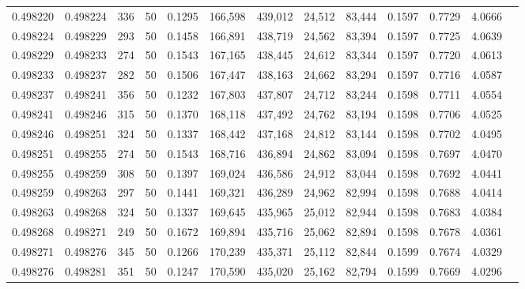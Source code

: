 \begin{tabular}{rrrrrrrrrrrrr}
0.498220 & 0.498224 & 336 &  50 &                                     0.1295 & 166,598 & 439,012 &  24,512 &  83,444 & 0.1597 & 0.7729 & 4.0666 \\
0.498224 & 0.498229 & 293 &  50 &                                     0.1458 & 166,891 & 438,719 &  24,562 &  83,394 & 0.1597 & 0.7725 & 4.0639 \\
0.498229 & 0.498233 & 274 &  50 &                                     0.1543 & 167,165 & 438,445 &  24,612 &  83,344 & 0.1597 & 0.7720 & 4.0613 \\
0.498233 & 0.498237 & 282 &  50 &                                     0.1506 & 167,447 & 438,163 &  24,662 &  83,294 & 0.1597 & 0.7716 & 4.0587 \\
0.498237 & 0.498241 & 356 &  50 &                                     0.1232 & 167,803 & 437,807 &  24,712 &  83,244 & 0.1598 & 0.7711 & 4.0554 \\
0.498241 & 0.498246 & 315 &  50 &                                     0.1370 & 168,118 & 437,492 &  24,762 &  83,194 & 0.1598 & 0.7706 & 4.0525 \\
0.498246 & 0.498251 & 324 &  50 &                                     0.1337 & 168,442 & 437,168 &  24,812 &  83,144 & 0.1598 & 0.7702 & 4.0495 \\
0.498251 & 0.498255 & 274 &  50 &                                     0.1543 & 168,716 & 436,894 &  24,862 &  83,094 & 0.1598 & 0.7697 & 4.0470 \\
0.498255 & 0.498259 & 308 &  50 &                                     0.1397 & 169,024 & 436,586 &  24,912 &  83,044 & 0.1598 & 0.7692 & 4.0441 \\
0.498259 & 0.498263 & 297 &  50 &                                     0.1441 & 169,321 & 436,289 &  24,962 &  82,994 & 0.1598 & 0.7688 & 4.0414 \\
0.498263 & 0.498268 & 324 &  50 &                                     0.1337 & 169,645 & 435,965 &  25,012 &  82,944 & 0.1598 & 0.7683 & 4.0384 \\
0.498268 & 0.498271 & 249 &  50 &                                     0.1672 & 169,894 & 435,716 &  25,062 &  82,894 & 0.1598 & 0.7678 & 4.0361 \\
0.498271 & 0.498276 & 345 &  50 &                                     0.1266 & 170,239 & 435,371 &  25,112 &  82,844 & 0.1599 & 0.7674 & 4.0329 \\
0.498276 & 0.498281 & 351 &  50 &                                     0.1247 & 170,590 & 435,020 &  25,162 &  82,794 & 0.1599 & 0.7669 & 4.0296 \\

\end{tabular}
